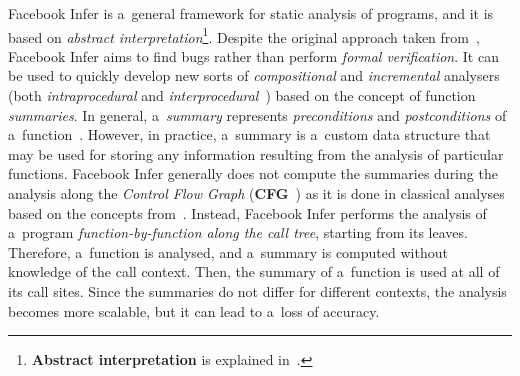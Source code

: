 \documentclass{ExcelAtFIT}
\theoremstyle{example}
\begin{document}
Facebook Infer is a~general framework for static analysis of programs, and it is based on \emph{abstract interpretation}\footnote{\textbf{Abstract interpretation} is explained in~\cite{AILatticeModelCousot, staticAnalysisMoller, programAnalysisNielson, staticAnalysisRival}.}. Despite the original approach taken from~\cite{inferBiabduction}, Facebook Infer aims to find bugs rather than perform \emph{formal verification}. It can be used to quickly develop new sorts of \emph{compositional} and \emph{incremental} analysers (both \emph{intraprocedural} and \emph{interprocedural}~\cite{programAnalysisNielson}) based on the concept of function \emph{summaries}. In general, a~\emph{summary} represents \emph{preconditions} and \emph{postconditions} of a~function~\cite{hoare}. However, in practice, a~summary is a~custom data structure that may be used for storing any information resulting from the analysis of particular functions. Facebook Infer generally does not compute the summaries during the analysis along the \emph{Control Flow Graph} (\textbf{CFG}~\cite{controlFlowAnalysisAllen}) as it is done in classical analyses based on the concepts from~\cite{DFAGraphReach, DFAApproaches}. Instead, Facebook Infer performs the analysis of a~program \emph{function-by-function along the call tree}, starting from its leaves. Therefore, a~function is analysed, and a~summary is computed without knowledge of the call context. Then, the summary of a~function is used at all of its call sites. Since the summaries do not differ for different contexts, the analysis becomes more scalable, but it can lead to a~loss of accuracy.
\end{document}
